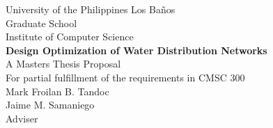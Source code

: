 \documentclass{style/icsthesis}
\renewcommand{\TITLE}{DESIGN OPTIMIZATION OF WATER DISTRIBUTION NETWORKS}
\renewcommand{\AUTHOR}{MARK FROILAN B. TANDOC}
\renewcommand{\DEGREE}{MASTER OF SCIENCE}
\renewcommand{\MAJOR}{COMPUTER SCIENCE}
\begin{document}
    \begin{frontmatter}
    \iffalse
		\maketitle
        
		\begin{approvalpage}
			The thesis hereto attached entitled \TITLE , prepared and submitted by \AUTHOR , in partial fulfillment of the requirements for the degree of \DEGREE\ (\MAJOR) is hereby accepted.
			
			\begin{multicols}{2}
				\centering
				\addsignature{JADERICK P. PABICO}{Member, Guidance Committee} %
				\columnbreak
				\addsignature{CONCEPTION L. KHAN}{Member, Guidance Committee}
			\end{multicols}
			\addsignature{JAIME M. SAMANIEGO}{Chair, Guidance Committee}
			
			Accepted as partial fulfillment of the requirements for the degree of \DEGREE\ (\MAJOR). 
			\addsignature{JAIME M. SAMANIEGO}{Director, Institute of Computer Science}
			\addsignature{JOSE V. CAMACHO}{Dean, Graduate School\\University of the Mars Los Ba\~{n}os}
		\end{approvalpage}
		
		\begin{biosketch}
			
			
			\addauthorsignaturefield
		\end{biosketch}	
		
		\begin{acknowledgement}
		
			
		\end{acknowledgement}
		
		\maketableofcontents
		
		\makelistoftables

		\makelistoffigures
	\fi
	    \begin{center}
	    University of the Philippines Los Ba\~{n}os\\
	    Graduate School\\
	    Institute of Computer Science\\
	    \vspace*{25ex}
	    \textbf{Design Optimization of Water Distribution Networks}\\
	    \vspace*{25ex}
	    A Masters Thesis Proposal\\
	    For partial fulfillment of the requirements in CMSC 300\\
	    \vspace*{10ex}
	    Mark Froilan B. Tandoc\\
	    \vspace*{8ex}
	    Jaime M. Samaniego\\
	    Adviser
	    \end{center}
	    

\end{frontmatter}
\end{document}
